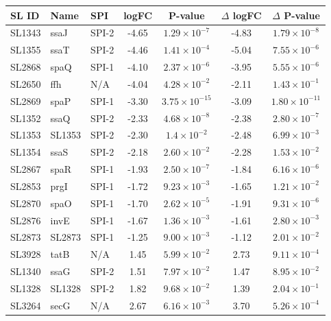 \begin{table}
\begin{tabular}{ l
    				l
				l
    				c
				c
				c
				c
				}
    \\
     \toprule
    \textbf{SL ID} & \textbf{Name} & \textbf{SPI} & \textbf{logFC} & \textbf{P-value} & \textbf{$\Delta$ logFC} & \textbf{$\Delta$ P-value} \\
    \midrule
    SL1343 & ssaJ & SPI-2 & -4.65 & $1.29\times10^{-7}$ & -4.83 & $1.79\times10^{-8}$\\
    SL1355 & ssaT & SPI-2 & -4.46 & $1.41\times10^{-4}$ & -5.04 & $7.55\times10^{-6}$\\
    SL2868 & spaQ & SPI-1 & -4.10 & $2.37\times10^{-6}$ & -3.95 & $5.55\times10^{-6}$\\
    SL2650 & ffh & N/A & -4.04 & $4.28\times10^{-2}$ & -2.11 & $1.43\times10^{-1}$\\
    SL2869 & spaP & SPI-1 & -3.30 & $3.75\times10^{-15}$ & -3.09 & $1.80\times10^{-11}$\\
    SL1352 & ssaQ & SPI-2 & -2.33 & $4.68\times10^{-8}$ & -2.38 & $2.80\times10^{-7}$\\
    SL1353 & SL1353 & SPI-2 & -2.30 & $1.4\times10^{-2}$ & -2.48 & $6.99\times10^{-3}$\\
    SL1354 & ssaS & SPI-2 & -2.18 & $2.60\times10^{-2}$ & -2.28 & $1.53\times10^{-2}$\\
    SL2867 & spaR & SPI-1 & -1.93 & $2.50\times10^{-7}$ & -1.84 & $6.16\times10^{-6}$\\
    SL2853 & prgI & SPI-1 & -1.72 & $9.23\times10^{-3}$ & -1.65 & $1.21\times10^{-2}$\\
    SL2870 & spaO & SPI-1 & -1.70 & $2.62\times10^{-5}$ & -1.91 & $9.31\times10^{-6}$\\
    SL2876 & invE & SPI-1 & -1.67 & $1.36\times10^{-3}$ & -1.61 & $2.80\times10^{-3}$\\
    SL2873 & SL2873 & SPI-1 & -1.25 & $9.00\times10^{-3}$ & -1.12 & $2.01\times10^{-2}$\\
    SL3928 & tatB & N/A & 1.45 & $5.99\times10^{-2}$ & 2.73 & $9.11\times10^{-4}$\\
    SL1340 & ssaG & SPI-2 & 1.51 & $7.97\times10^{-2}$ & 1.47 & $8.95\times10^{-2}$\\
    SL1328 & SL1328 & SPI-2 & 1.82 & $9.68\times10^{-2}$ & 1.39 & $2.04\times10^{-1}$\\
    SL3264 & secG & N/A & 2.67 & $6.16\times10^{-3}$ & 3.70 & $5.26\times10^{-4}$\\
    \bottomrule
    \end{tabular}%
    \label{tab:bss}%
\end{table}

